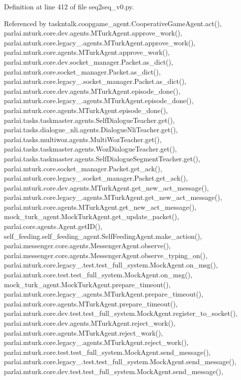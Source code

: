Definition at line 412 of file seq2seq\+\_\+v0.\+py.



Referenced by taskntalk.\+coopgame\+\_\+agent.\+Cooperative\+Game\+Agent.\+act(), parlai.\+mturk.\+core.\+dev.\+agents.\+M\+Turk\+Agent.\+approve\+\_\+work(), parlai.\+mturk.\+core.\+legacy\+\_.\+agents.\+M\+Turk\+Agent.\+approve\+\_\+work(), parlai.\+mturk.\+core.\+agents.\+M\+Turk\+Agent.\+approve\+\_\+work(), parlai.\+mturk.\+core.\+dev.\+socket\+\_\+manager.\+Packet.\+as\+\_\+dict(), parlai.\+mturk.\+core.\+socket\+\_\+manager.\+Packet.\+as\+\_\+dict(), parlai.\+mturk.\+core.\+legacy\+\_.\+socket\+\_\+manager.\+Packet.\+as\+\_\+dict(), parlai.\+mturk.\+core.\+dev.\+agents.\+M\+Turk\+Agent.\+episode\+\_\+done(), parlai.\+mturk.\+core.\+legacy\+\_.\+agents.\+M\+Turk\+Agent.\+episode\+\_\+done(), parlai.\+mturk.\+core.\+agents.\+M\+Turk\+Agent.\+episode\+\_\+done(), parlai.\+tasks.\+taskmaster.\+agents.\+Self\+Dialogue\+Teacher.\+get(), parlai.\+tasks.\+dialogue\+\_\+nli.\+agents.\+Dialogue\+Nli\+Teacher.\+get(), parlai.\+tasks.\+multiwoz.\+agents.\+Multi\+Woz\+Teacher.\+get(), parlai.\+tasks.\+taskmaster.\+agents.\+Woz\+Dialogue\+Teacher.\+get(), parlai.\+tasks.\+taskmaster.\+agents.\+Self\+Dialogue\+Segment\+Teacher.\+get(), parlai.\+mturk.\+core.\+socket\+\_\+manager.\+Packet.\+get\+\_\+ack(), parlai.\+mturk.\+core.\+legacy\+\_.\+socket\+\_\+manager.\+Packet.\+get\+\_\+ack(), parlai.\+mturk.\+core.\+dev.\+agents.\+M\+Turk\+Agent.\+get\+\_\+new\+\_\+act\+\_\+message(), parlai.\+mturk.\+core.\+legacy\+\_.\+agents.\+M\+Turk\+Agent.\+get\+\_\+new\+\_\+act\+\_\+message(), parlai.\+mturk.\+core.\+agents.\+M\+Turk\+Agent.\+get\+\_\+new\+\_\+act\+\_\+message(), mock\+\_\+turk\+\_\+agent.\+Mock\+Turk\+Agent.\+get\+\_\+update\+\_\+packet(), parlai.\+core.\+agents.\+Agent.\+get\+I\+D(), self\+\_\+feeding.\+self\+\_\+feeding\+\_\+agent.\+Self\+Feeding\+Agent.\+make\+\_\+action(), parlai.\+messenger.\+core.\+agents.\+Messenger\+Agent.\+observe(), parlai.\+messenger.\+core.\+agents.\+Messenger\+Agent.\+observe\+\_\+typing\+\_\+on(), parlai.\+mturk.\+core.\+legacy\+\_.\+test.\+test\+\_\+full\+\_\+system.\+Mock\+Agent.\+on\+\_\+msg(), parlai.\+mturk.\+core.\+test.\+test\+\_\+full\+\_\+system.\+Mock\+Agent.\+on\+\_\+msg(), mock\+\_\+turk\+\_\+agent.\+Mock\+Turk\+Agent.\+prepare\+\_\+timeout(), parlai.\+mturk.\+core.\+legacy\+\_.\+agents.\+M\+Turk\+Agent.\+prepare\+\_\+timeout(), parlai.\+mturk.\+core.\+agents.\+M\+Turk\+Agent.\+prepare\+\_\+timeout(), parlai.\+mturk.\+core.\+dev.\+test.\+test\+\_\+full\+\_\+system.\+Mock\+Agent.\+register\+\_\+to\+\_\+socket(), parlai.\+mturk.\+core.\+dev.\+agents.\+M\+Turk\+Agent.\+reject\+\_\+work(), parlai.\+mturk.\+core.\+agents.\+M\+Turk\+Agent.\+reject\+\_\+work(), parlai.\+mturk.\+core.\+legacy\+\_.\+agents.\+M\+Turk\+Agent.\+reject\+\_\+work(), parlai.\+mturk.\+core.\+test.\+test\+\_\+full\+\_\+system.\+Mock\+Agent.\+send\+\_\+message(), parlai.\+mturk.\+core.\+legacy\+\_.\+test.\+test\+\_\+full\+\_\+system.\+Mock\+Agent.\+send\+\_\+message(), parlai.\+mturk.\+core.\+dev.\+test.\+test\+\_\+full\+\_\+system.\+Mock\+Agent.\+send\+\_\+message(), 